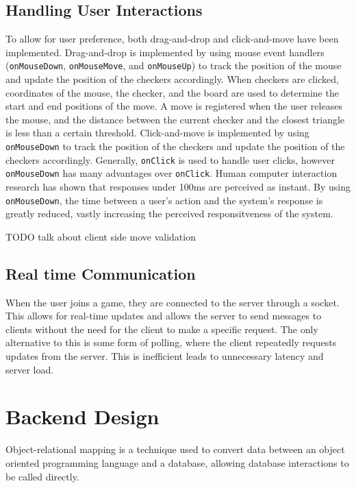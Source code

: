 \subsection{Handling User Interactions}
\label{sec:userinteractions}
To allow for user preference, both drag-and-drop and click-and-move have been implemented. 
Drag-and-drop is implemented by using mouse event handlers (\verb|onMouseDown|, \verb|onMouseMove|, and \verb|onMouseUp|) to track the position of the mouse and update the position of the checkers accordingly. When checkers are clicked, coordinates of the mouse, the checker, and the board are used to determine the start and end positions of the move. A move is registered when the user releases the mouse, and the distance between the current checker and the closest triangle is less than a certain threshold. 
Click-and-move is implemented by using \verb|onMouseDown| to track the position of the checkers and update the position of the checkers accordingly. Generally, \verb|onClick| is used to handle user clicks, however \verb|onMouseDown| has many advantages over \verb|onClick|. Human computer interaction research \cite{mousedown1} \cite{mousedown2} has shown that responses under 100ms are perceived as instant. By using \verb|onMouseDown|, the time between a user's action and the system's response is greatly reduced, vastly increasing the perceived responsitveness of the system.

TODO talk about client side move validation

\subsection{Real time Communication}
When the user joins a game, they are connected to the server through a socket. This allows for real-time updates and allows the server to send messages to clients without the need for the client to make a specific request. The only alternative to this is some form of polling, where the client repeatedly requests updates from the server. This is inefficient leads to unnecessary latency and server load.

\section{Backend Design}

\begin{definition}
Object-relational mapping is a technique used to convert data between an object oriented programming language and a database, allowing database interactions to be called directly.
\end{definition}

